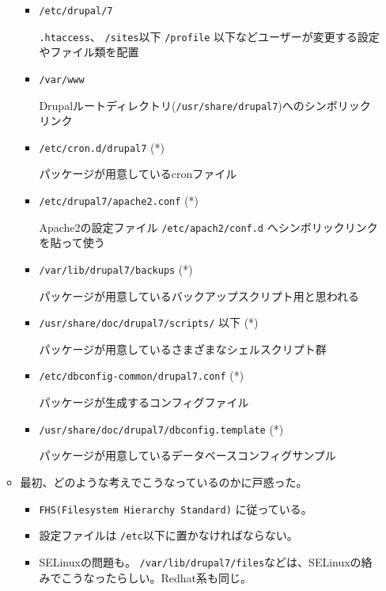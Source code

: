 \documentclass[mingoth,a4paper]{jsarticle}
\begin{document}
\begin{itemize}
\begin{itemize}
\begin{itemize}
    \item {\tt /etc/drupal/7}

      {\tt .htaccess}、 {\tt /sites}以下 {\tt /profile} 以下などユーザーが変更する設定やファイル類を配置

    \item {\tt /var/www}

      Drupalルートディレクトリ({\tt /usr/share/drupal7})へのシンボリックリンク

    \item {\tt /etc/cron.d/drupal7} (*)

      パッケージが用意しているcronファイル

    \item {\tt /etc/drupal7/apache2.conf} (*)

      Apache2の設定ファイル {\tt /etc/apach2/conf.d} へシンボリックリンクを貼って使う

    \item {\tt /var/lib/drupal7/backups} (*)

      パッケージが用意しているバックアップスクリプト用と思われる

    \item {\tt /usr/share/doc/drupal7/scripts/} 以下 (*)

      パッケージが用意しているさまざまなシェルスクリプト群

    \item {\tt /etc/dbconfig-common/drupal7.conf} (*)

      パッケージが生成するコンフィグファイル

    \item {\tt /usr/share/doc/drupal7/dbconfig.template} (*)

      パッケージが用意しているデータベースコンフィグサンプル
    \end{itemize}

  \item 最初、どのような考えでこうなっているのかに戸惑った。
    \begin{itemize}
    \item {\tt FHS(Filesystem Hierarchy Standard)} に従っている。\cite{policyfhs}\cite{wikifhs}
    \item 設定ファイルは {\tt /etc}以下に置かなければならない。\cite{policyfiles}
    \item SELinuxの問題も。
      {\tt /var/lib/drupal7/files}などは、SELinuxの絡みでこうなったらしい。Redhat系も同じ。\cite{bugselinux}
    \end{itemize}


\end{itemize}
\end{itemize}
\end{document}
